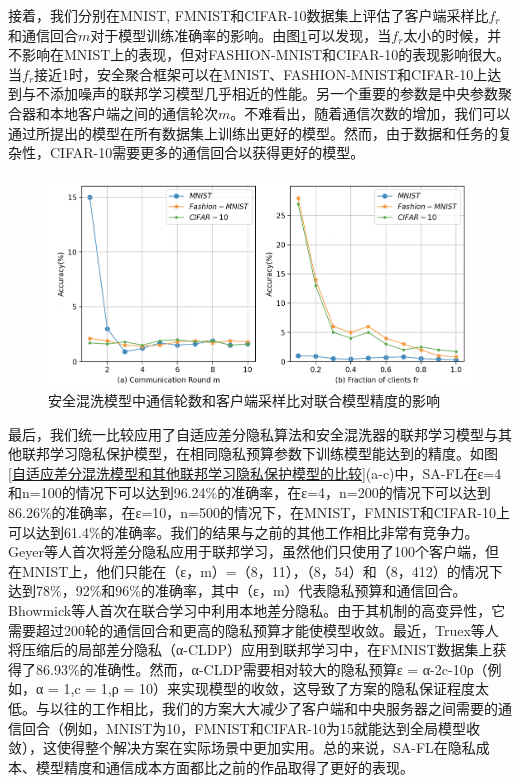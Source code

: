 接着，我们分别在MNIST, FMNIST和CIFAR-10数据集上评估了客户端采样比$f_{r}$和通信回合$m$对于模型训练准确率的影响。由图\ref{fig:安全混洗模型中通信轮数和客户端采样比对联合模型精度的影响}可以发现，当$f_{r}$太小的时候，并不影响在MNIST上的表现，但对FASHION-MNIST和CIFAR-10的表现影响很大。当$f_{r}$接近1时，安全聚合框架可以在MNIST、FASHION-MNIST和CIFAR-10上达到与不添加噪声的联邦学习模型几乎相近的性能。另一个重要的参数是中央参数聚合器和本地客户端之间的通信轮次$m$。不难看出，随着通信次数的增加，我们可以通过所提出的模型在所有数据集上训练出更好的模型。然而，由于数据和任务的复杂性，CIFAR-10需要更多的通信回合以获得更好的模型。

\begin{figure}[!hbt]
\centering
  	\includegraphics[scale=0.4]{fig2/C5/SA-FL2}%
	\caption{安全混洗模型中通信轮数和客户端采样比对联合模型精度的影响}
  	\label{fig:安全混洗模型中通信轮数和客户端采样比对联合模型精度的影响} 
\end{figure}

最后，我们统一比较应用了自适应差分隐私算法和安全混洗器的联邦学习模型与其他联邦学习隐私保护模型，在相同隐私预算参数下训练模型能达到的精度。如图\ref{自适应差分混洗模型和其他联邦学习隐私保护模型的比较}(a-c)中，SA-FL在ε=4和n=100的情况下可以达到96.24$\%$的准确率，在ε=4，n=200的情况下可以达到86.26$\%$的准确率，在ε=10，n=500的情况下，在MNIST，FMNIST和CIFAR-10上可以达到61.4$\%$的准确率。我们的结果与之前的其他工作相比非常有竞争力。Geyer等人首次将差分隐私应用于联邦学习，虽然他们只使用了100个客户端，但在MNIST上，他们只能在（ε，m）=（8，11），（8，54）和（8，412）的情况下达到78$\%$，92$\%$和96$\%$的准确率，其中（ε，m）代表隐私预算和通信回合。Bhowmick等人首次在联合学习中利用本地差分隐私。由于其机制的高变异性，它需要超过200轮的通信回合和更高的隐私预算才能使模型收敛。最近，Truex等人将压缩后的局部差分隐私（α-CLDP）应用到联邦学习中，在FMNIST数据集上获得了86.93$\%$的准确性。然而，α-CLDP需要相对较大的隐私预算ε = α-2c-10ρ（例如，α = 1,c = 1,ρ = 10）来实现模型的收敛，这导致了方案的隐私保证程度太低。与以往的工作相比，我们的方案大大减少了客户端和中央服务器之间需要的通信回合（例如，MNIST为10，FMNIST和CIFAR-10为15就能达到全局模型收敛），这使得整个解决方案在实际场景中更加实用。总的来说，SA-FL在隐私成本、模型精度和通信成本方面都比之前的作品取得了更好的表现。

